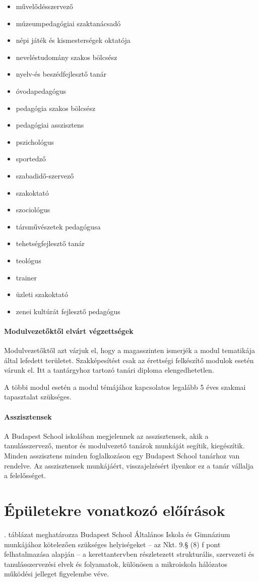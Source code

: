 \begin{itemize}
\item művelődésszervező
\item múzeumpedagógiai szaktanácsadó
\item népi játék és kismesterségek oktatója
\item neveléstudomány szakos bölcsész
\item nyelv-és beszédfejlesztő tanár
\item óvodapedagógus
\item pedagógia szakos bölcsész
\item pedagógiai asszisztens
\item pszichológus
\item sportedző
\item szabadidő-szervező
\item szakoktató
\item szociológus
\item társművészetek pedagógusa
\item tehetségfejlesztő tanár
\item teológus
\item trainer
\item üzleti szakoktató
\item zenei kultúrát fejlesztő pedagógus
\end{itemize}

\paragraph{Modulvezetőktől elvárt végzettségek}
Modulvezetőktől azt várjuk el, hogy a magasszinten ismerjék a modul tematikája által lefedett területet. Szakképesítést csak az érettségi felkészítő modulok esetén várunk el. Itt a tantárgyhoz tartozó tanári diploma elengedhetetlen.

A többi modul esetén a modul témájához kapcsolatos legalább 5 éves szakmai tapasztalat szükséges.

\paragraph{Asszisztensek}
A Budapest School iskolában megjelennek az asszisztensek, akik a tanulásszervező, mentor és modulvezető tanárok munkáját segítik, kiegészítik. Minden asszisztens minden foglalkozáson egy Budapest School tanárhoz van rendelve. Az asszisztensek munkájáért, visszajelzésért ilyenkor ez a tanár vállalja a felelősséget.


\section{Épületekre vonatkozó előírások}
. táblázat meghatározza Budapest School Általános Iskola és Gimnázium munkájához kötelezően szükséges helyiségeket -- az Nkt. 9.§ (8) f pont felhatalmazása alapján -- a kerettantervben részletezett strukturális, szervezeti és tanulásszervezési elvek és folyamatok, különösen a mikroiskola hálózatos működési jelleget figyelembe véve.


